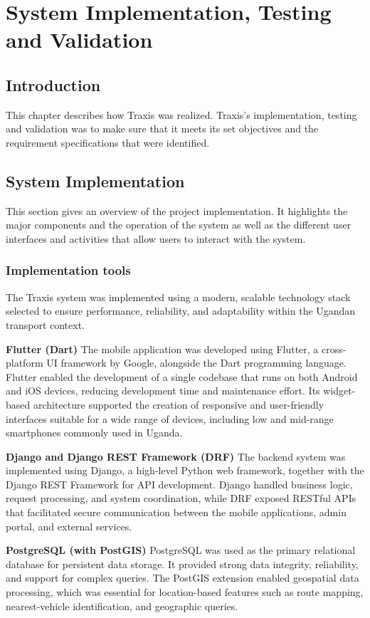 \chapter{System Implementation, Testing and Validation}

\section{Introduction}
This chapter describes how Traxis was realized. Traxis's implementation, testing
and validation was to make sure that it meets its set objectives and the
requirement specifications that were identified.


\section{System Implementation}
This section gives an overview of the project implementation. It highlights the
major components and the operation of the system as well as the different user
interfaces and activities that allow users to interact with the system.


\subsection{Implementation tools}
The Traxis system was implemented using a modern, scalable technology stack
selected to ensure performance, reliability, and adaptability within the Ugandan
transport context.


\textbf{Flutter (Dart)}
The mobile application was developed using Flutter, a cross-platform UI
framework by Google, alongside the Dart programming language. Flutter enabled
the development of a single codebase that runs on both Android and iOS devices,
reducing development time and maintenance effort. Its widget-based architecture
supported the creation of responsive and user-friendly interfaces suitable for a
wide range of devices, including low and mid-range smartphones commonly used in
Uganda.


\textbf{Django and Django REST Framework (DRF)}
The backend system was implemented using Django, a high-level Python web
framework, together with the Django REST Framework for API development. Django
handled business logic, request processing, and system coordination, while DRF
exposed RESTful APIs that facilitated secure communication between the mobile
applications, admin portal, and external services.


\textbf{PostgreSQL (with PostGIS)}
PostgreSQL was used as the primary relational database for persistent data
storage. It provided strong data integrity, reliability, and support for complex
queries. The PostGIS extension enabled geospatial data processing, which was
essential for location-based features such as route mapping, nearest-vehicle
identification, and geographic queries.


